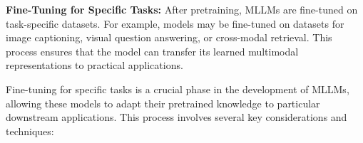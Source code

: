 
\textbf{Fine-Tuning for Specific Tasks:} After pretraining, MLLMs are fine-tuned on task-specific datasets. For example, models may be fine-tuned on datasets for image captioning, visual question answering, or cross-modal retrieval. This process ensures that the model can transfer its learned multimodal representations to practical applications.

Fine-tuning for specific tasks is a crucial phase in the development of MLLMs, allowing these models to adapt their pretrained knowledge to particular downstream applications. This process involves several key considerations and techniques:

